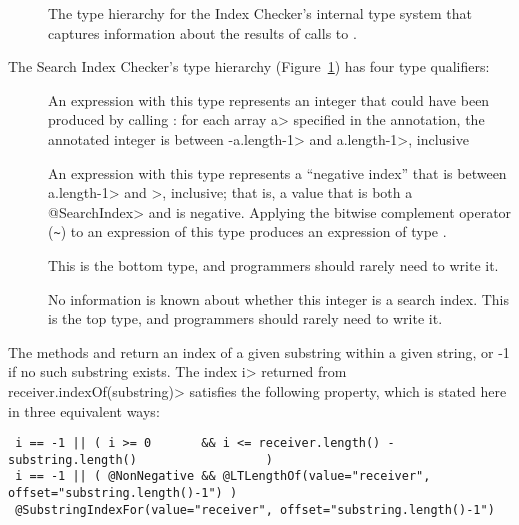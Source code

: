 \begin{figure}
\begin{center}
  \hfill
  \hfill
\end{center}
  \caption{The type hierarchy for the Index Checker's internal type system
  that captures information about the results of calls to
  .}
  \label{fig-index-searchindex}
\end{figure}

The Search Index Checker's type hierarchy (Figure~\ref{fig-index-searchindex}) has four type qualifiers:
\begin{description}
\item[]
  An expression with this type represents an integer that could have been
  produced by calling
  :
  for each array \<a> specified in the annotation, the annotated integer is
  between \<-a.length-1> and \<a.length-1>, inclusive
\item[]
  An expression with this type represents a ``negative index'' that is
  between \<a.length-1> and >, inclusive; that is, a value that is both
  a \<@SearchIndex> and is negative.  Applying the bitwise complement
  operator (\verb|~|) to an expression of this type produces an expression
  of type .
\item[]
  This is the bottom type, and programmers should rarely need to write it.
\item[]
  No information is known about whether this integer is a search index.
  This is the top type, and programmers should rarely need to write it.
\end{description}



The methods
and
return an index of a given substring within a given string, or -1 if no
such substring exists.  The index \<i> returned from
\<receiver.indexOf(substring)> satisfies the following property, which is
stated here in three equivalent ways:
\begin{Verbatim}
 i == -1 || ( i >= 0       && i <= receiver.length() - substring.length()                  )
 i == -1 || ( @NonNegative && @LTLengthOf(value="receiver", offset="substring.length()-1") )
 @SubstringIndexFor(value="receiver", offset="substring.length()-1")
\end{Verbatim}

